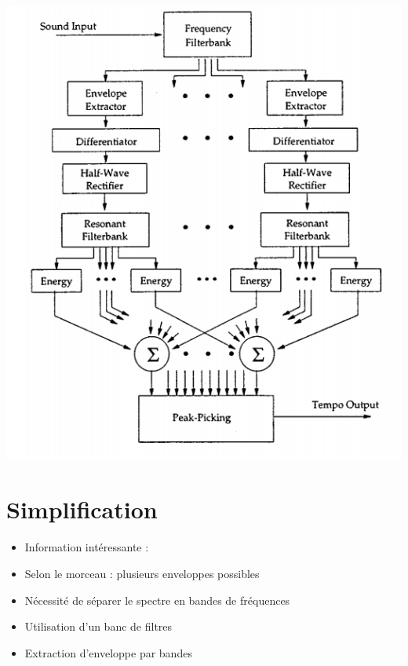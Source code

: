 \documentclass{beamer}
\begin{document}
\begin{frame}
\begin{center}
 \includegraphics[scale = 0.3]{Algo.png}
\end{center}
 \end{frame}
 


 \section{Simplification}
 \begin{frame}
  \begin{itemize}
  \item Information intéressante : 
  \item<3-> Selon le morceau : plusieurs enveloppes possibles
  \item<4-> Nécessité de séparer le spectre en bandes de fréquences
  \item<5-> Utilisation d'un banc de filtres
  \item<6-> Extraction d'enveloppe par bandes
  \end{itemize}
 \end{frame}
\end{document}
